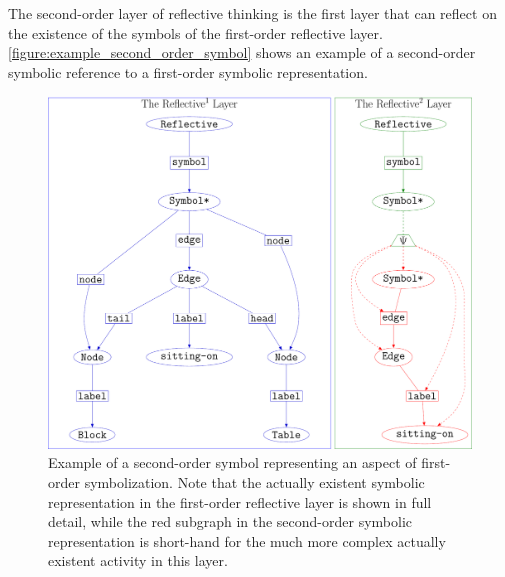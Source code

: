 The second-order layer of reflective thinking is the first layer that
can reflect on the existence of the symbols of the first-order
reflective layer.
{\mbox{\autoref{figure:example_second_order_symbol}}} shows an example
of a second-order symbolic reference to a first-order symbolic
representation.
\begin{figure}
\center
\includegraphics[width=12cm]{gfx/example_second_order_symbol}
\caption[Example of a second-order symbol representing first-order
  symbolization activity.]{Example of a second-order symbol
  representing an aspect of first-order symbolization.  Note that the
  actually existent symbolic representation in the first-order
  reflective layer is shown in full detail, while the red subgraph in
  the second-order symbolic representation is short-hand for the much
  more complex actually existent activity in this layer.}
\label{figure:example_second_order_symbol}
\end{figure}
